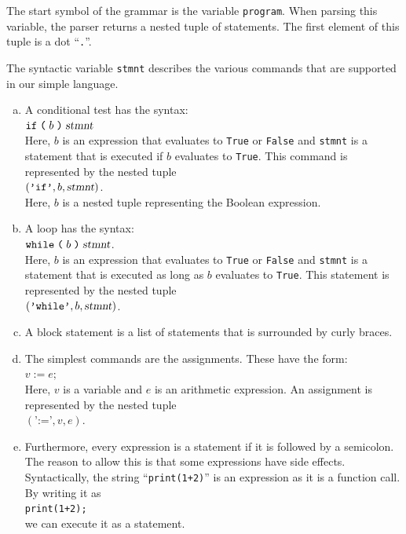 The start symbol of the grammar is the variable \texttt{program}.
When parsing this variable, the parser returns a nested tuple of statements.
The first element of this tuple is a dot ``\texttt{.}''.

The syntactic variable \texttt{stmnt} describes the various commands that 
are supported in our simple language.
\begin{enumerate}[(a)]
\item A conditional test has the syntax:
      \\[0.2cm]
      \hspace*{1.3cm}
      $\texttt{if}\; \texttt{(}\; b\; \texttt{)}\; \textsl{stmnt}\; $
      \\[0.2cm]
      Here, $b$ is an expression that evaluates to \texttt{True} or \texttt{False}
      and \texttt{stmnt} is a statement that is executed if
      $b$ evaluates to \texttt{True}.
      This command is represented by the nested tuple
      \\[0.2cm]
      \hspace*{1.3cm}
      $(\texttt{'if'}, b, \textsl{stmnt})$.
      \\[0.2cm]
      Here, $b$ is a nested tuple representing the Boolean expression.
\item A loop has the syntax:
      \\[0.2cm]
      \hspace*{1.3cm}
      $\texttt{while}\; \texttt{(}\; b\; \texttt{)}\;  \textsl{stmnt}$.
      \\[0.2cm]
      Here, $b$ is an expression that evaluates to \texttt{True} or \texttt{False}
      and \texttt{stmnt} is a statement that is executed as long as
      $b$ evaluates to \texttt{True}.
      This statement is represented by the nested tuple
      \\[0.2cm]
      \hspace*{1.3cm}
      $(\texttt{'while'}, b, \textsl{stmnt})$.
\item A block statement is a list of statements that is surrounded by curly braces.
\item The simplest commands are the assignments. These have the form:
      \\[0.2cm]
      \hspace*{1.3cm}
      $v \;\texttt{:=}\; e \texttt{;}$
      \\[0.2cm]
      Here, $v$ is a variable and $e$ is an arithmetic expression.
      An assignment is represented by the nested tuple
      \\[0.2cm]
      \hspace*{1.3cm}
      $(\texttt{':='}, v, e)$.
\item Furthermore, every expression is a statement if it is followed by a semicolon.
      The reason to allow this is that some expressions have side effects.  Syntactically,
      the string ``\texttt{print(1+2)}'' is an expression as it is a function call.
      By writing it as
      \\[0.2cm]
      \hspace*{1.3cm}
      \texttt{print(1+2);}
      \\[0.2cm]
      we can execute it as a statement.
\end{enumerate}
\pagebreak

